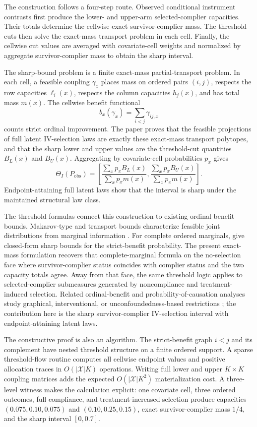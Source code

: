 The construction follows a four-step route.  Observed conditional instrument contrasts first produce the lower- and upper-arm selected-complier capacities.  Their totals determine the cellwise exact survivor-complier mass.  The threshold cuts then solve the exact-mass transport problem in each cell.  Finally, the cellwise cut values are averaged with covariate-cell weights and normalized by aggregate survivor-complier mass to obtain the sharp interval.

The sharp-bound problem is a finite exact-mass partial-transport problem.  In each cell, a feasible coupling \(\gamma_x\) places mass on ordered pairs \((i,j)\), respects the row capacities \(\ell_i(x)\), respects the column capacities \(h_j(x)\), and has total mass \(m(x)\).  The cellwise benefit functional
\[
b_x(\gamma_x)=\sum_{i<j}\gamma_{ij,x}
\]
counts strict ordinal improvement.  The paper proves that the feasible projections of full latent IV-selection laws are exactly these exact-mass transport polytopes, and that the sharp lower and upper values are the threshold-cut quantities \(B_L(x)\) and \(B_U(x)\).  Aggregating by covariate-cell probabilities \(p_x\) gives
\[
\Theta_I(P_{\mathrm{obs}})
=
\left[
\frac{\sum_x p_x B_L(x)}{\sum_x p_x m(x)},
\frac{\sum_x p_x B_U(x)}{\sum_x p_x m(x)}
\right].
\]
Endpoint-attaining full latent laws show that the interval is sharp under the maintained structural law class.

The threshold formulas connect this construction to existing ordinal benefit bounds.  Makarov-type and transport bounds characterize feasible joint distributions from marginal information \citep{Makarov1982,WilliamsonDowns1990,FanPark2010,Villani2009}.  For complete ordered marginals, \citet{LuDingDasgupta2018} give closed-form sharp bounds for the strict-benefit probability.  The present exact-mass formulation recovers that complete-marginal formula on the no-selection face where survivor-complier status coincides with complier status and the two capacity totals agree.  Away from that face, the same threshold logic applies to selected-complier submeasures generated by noncompliance and treatment-induced selection.  Related ordinal-benefit and probability-of-causation analyses study graphical, interventional, or unconfoundedness-based restrictions \citep{TianPearl2000,SachsEtAl2023,DuarteEtAl2023,GabrielSachsJensen2024,deAguasEtAl2025,ChenLi2026}; the contribution here is the sharp survivor-complier IV-selection interval with endpoint-attaining latent laws.

The constructive proof is also an algorithm.  The strict-benefit graph \(i<j\) and its complement have nested threshold structure on a finite ordered support.  A sparse threshold-flow routine computes all cellwise endpoint values and positive allocation traces in \(O(|\mathcal X|K)\) operations.  Writing full lower and upper \(K\times K\) coupling matrices adds the expected \(O(|\mathcal X|K^2)\) materialization cost.  A three-level witness makes the calculation explicit: one covariate cell, three ordered outcomes, full compliance, and treatment-increased selection produce capacities \((0.075,0.10,0.075)\) and \((0.10,0.25,0.15)\), exact survivor-complier mass \(1/4\), and the sharp interval \([0,0.7]\).

